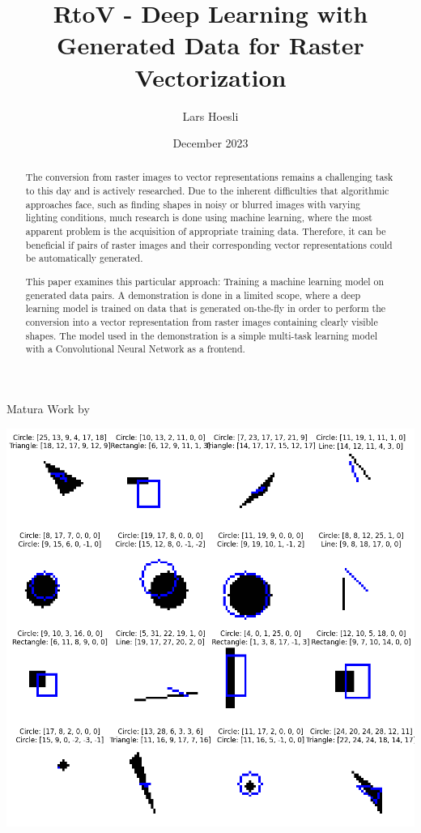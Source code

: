 \documentclass[12pt, a4paper, titlepage]{report}
\title{RtoV - Deep Learning with Generated Data for Raster Vectorization}
\author{Lars Hoesli}
\date{December 2023}
\begin{document}

\begin{titlepage}
    \centering

    \Huge{\textbf{\inserttitle}}
    \par
    \Large{Matura Work by \insertauthor}
    \vspace{1cm}\par
    \large{\insertdate}
    \vspace{2cm}

    \includegraphics[width=1.0\textwidth]{../rc/images/all_shapes_approx_visual1.png}
    \vfill
    \begin{abstract}
       The conversion from raster images to vector representations remains a challenging task to this day and is actively researched. Due to the inherent difficulties that algorithmic approaches face, such as finding shapes in noisy or blurred images with varying lighting conditions, much research is done using machine learning, where the most apparent problem is the acquisition of appropriate training data. Therefore, it can be beneficial if pairs of raster images and their corresponding vector representations could be automatically generated.

		 This paper examines this particular approach: Training a machine learning model on generated data pairs. A demonstration is done in a limited scope, where a deep learning model is trained on data that is generated on-the-fly in order to perform the conversion into a vector representation from raster images containing clearly visible shapes. The model used in the demonstration is a simple multi-task learning model with a Convolutional Neural Network as a frontend.


\end{abstract}
\end{titlepage}
\end{document}
